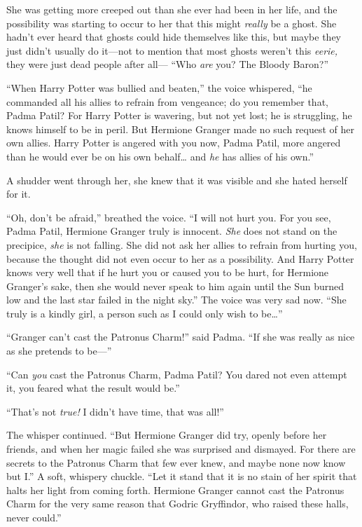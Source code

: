 She was getting more creeped out than she ever had been in her life, and
the possibility was starting to occur to her that this might
\emph{really} be a ghost. She hadn't ever heard that ghosts could hide
themselves like this, but maybe they just didn't usually do it---not to
mention that most ghosts weren't this \emph{eerie,} they were just dead
people after all--- ``Who \emph{are} you? The Bloody Baron?''

``When Harry Potter was bullied and beaten,'' the voice whispered, ``he
commanded all his allies to refrain from vengeance; do you remember
that, Padma Patil? For Harry Potter is wavering, but not yet lost; he is
struggling, he knows himself to be in peril. But Hermione Granger made
no such request of her own allies. Harry Potter is angered with you now,
Padma Patil, more angered than he would ever be on his own
behalf\ldots{} and \emph{he} has allies of his own.''

A shudder went through her, she knew that it was visible and she hated
herself for it.

``Oh, don't be afraid,'' breathed the voice. ``I will not hurt you. For
you see, Padma Patil, Hermione Granger truly is innocent. \emph{She}
does not stand on the precipice, \emph{she} is not falling. She did not
ask her allies to refrain from hurting you, because the thought did not
even occur to her as a possibility. And Harry Potter knows very well
that if he hurt you or caused you to be hurt, for Hermione Granger's
sake, then she would never speak to him again until the Sun burned low
and the last star failed in the night sky.'' The voice was very sad now.
``She truly is a kindly girl, a person such as I could only wish to
be\ldots{}''

``Granger can't cast the Patronus Charm!'' said Padma. ``If she was
really as nice as she pretends to be---''

``Can \emph{you} cast the Patronus Charm, Padma Patil? You dared not
even attempt it, you feared what the result would be.''

``That's not \emph{true!} I didn't have time, that was all!''

The whisper continued. ``But Hermione Granger did try, openly before her
friends, and when her magic failed she was surprised and dismayed. For
there are secrets to the Patronus Charm that few ever knew, and maybe
none now know but I.'' A soft, whispery chuckle. ``Let it stand that it
is no stain of her spirit that halts her light from coming forth.
Hermione Granger cannot cast the Patronus Charm for the very same reason
that Godric Gryffindor, who raised these halls, never could.''


